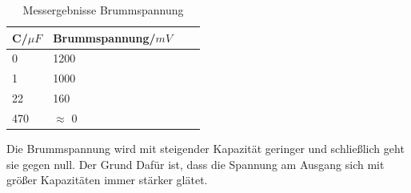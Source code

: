 \newpage
\begin{table}[!h]
\begin{center}
\caption{Messergebnisse Brummspannung}
\begin{tabular}{|l|l|l|l}
\hline
C/$\mu F$ & Brummspannung/$mV$ \\
\hline
0 & 1200\\
\hline
1 & 1000 \\
\hline
22 & 160 \\
\hline
470 & $\approx$ 0\\
\hline
\end{tabular}
\end{center}
\end{table}
\noindent
Die Brummspannung wird mit steigender Kapazit\"at geringer und schlie\ss lich geht sie gegen null. Der Grund Daf\"ur ist, dass die Spannung am Ausgang sich mit gr\"o\ss er Kapazit\"aten immer st\"arker gl\"atet.


